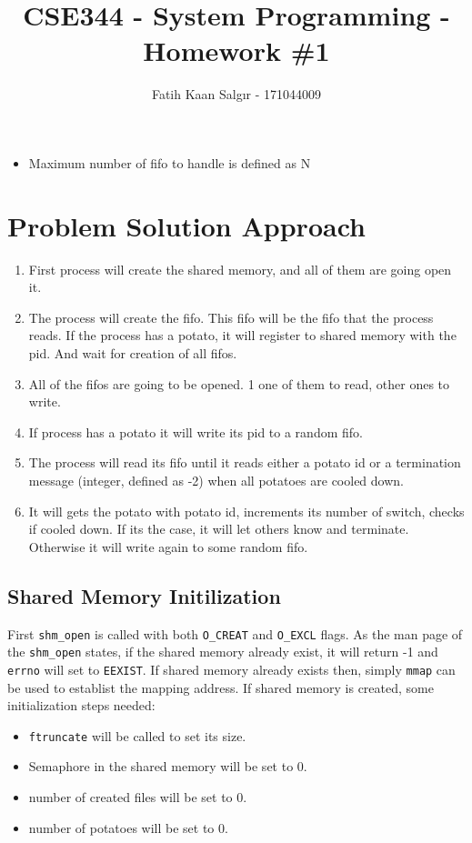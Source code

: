 \documentclass[a4paper]{article}
\author{Fatih Kaan Salgır - 171044009}
\date{}
\title{CSE344 - System Programming - Homework \#1}
\begin{document}
\maketitle
\begin{itemize}
\item Maximum number of fifo to handle is defined as N
\end{itemize}

\section{Problem Solution Approach}
\label{sec:orgfa0ac24}

\begin{enumerate}
\item First process will create the shared memory, and all of them are going open it.
\item The process will create the fifo. This fifo will be the fifo that the process reads. If the process has a potato, it will register to shared memory with the pid. And wait for creation of all fifos.
\item All of the fifos are going to be opened. 1 one of them to read, other ones to write.
\item If process has a potato it will write its pid to a random fifo.
\item The process will read its fifo until it reads either a potato id or a termination message (integer, defined as -2) when all potatoes are cooled down.
\item It will gets the potato with potato id, increments its number of switch, checks if cooled down. If its the case, it will let others know and terminate. Otherwise it will write again to some random fifo.
\end{enumerate}

\subsection{Shared Memory Initilization}
\label{sec:orge301529}
First \texttt{shm\_open} is called with both \texttt{O\_CREAT} and \texttt{O\_EXCL} flags. As the man page of the \texttt{shm\_open} states, if the shared memory already exist, it will return -1 and \texttt{errno} will set to \texttt{EEXIST}. 
If shared memory already exists then, simply \texttt{mmap} can be used to establist the mapping address.
If shared memory is created, some initialization steps needed:
\begin{itemize}
\item \texttt{ftruncate} will be called to set its size.
\item Semaphore in the shared memory will be set to 0.
\item number of created files will be set to 0.
\item number of potatoes will be set to 0.
\end{itemize}
\end{document}
